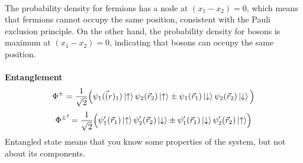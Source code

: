 \documentclass{article}
\begin{document}
\\The probability density for fermions has a node at $(x_1-x_2) = 0$, which means that fermions cannot occupy the same position, consistent with the Pauli exclusion principle. On the other hand, the probability density for bosons is maximum at $(x_1-x_2) = 0$, indicating that bosons can occupy the same position.
\\ \\ 
\textbf{Entanglement}
$$\Phi^{\pm} = \frac{1}{\sqrt{2}} \Bigl( \psi_1(\vec(r)_1) \ket{\uparrow} \psi_2(\Vec{r}_2) \ket{\uparrow} \pm \psi_1(\vec{r}_1) \ket{\downarrow} \psi_2(\vec{r}_2) \ket{\downarrow} \Bigl)$$
$${\Phi^{\pm}}' = \frac{1}{\sqrt{2}} \Bigl( \psi_1'(\vec{r}_1) \ket{\uparrow} \psi_2'(\vec{r}_2) \ket{\downarrow} \pm \psi_1'(\vec{r}_1) \ket{\downarrow} \psi_2'(\vec{r}_2) \ket{\uparrow} \Bigr)$$
Entangled state means that you know some properties of the system, but  not about its components.
\end{document}
